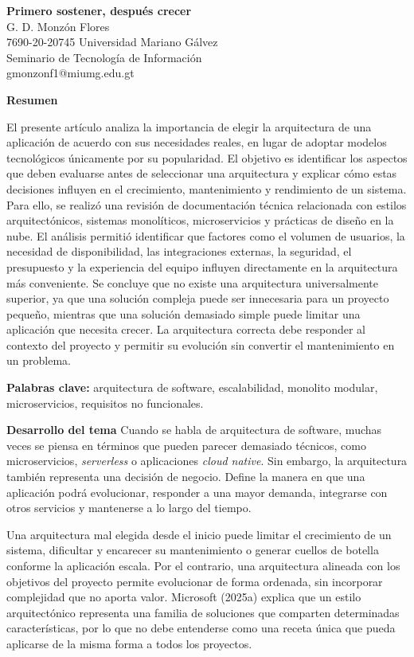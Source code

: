 \documentclass[12pt,letterpaper]{article}
\begin{document}
\begin{center}
    {\large\textbf{Primero sostener, después crecer}}\\[0.3cm]
    G. D. Monzón Flores\\
    7690-20-20745 Universidad Mariano Gálvez\\[0.15cm]
    Seminario de Tecnología de Información\\
    gmonzonf1@miumg.edu.gt
\end{center}

\textbf{Resumen}

El presente artículo analiza la importancia de elegir la arquitectura de una aplicación de acuerdo con sus necesidades reales, en lugar de adoptar modelos tecnológicos únicamente por su popularidad. El objetivo es identificar los aspectos que deben evaluarse antes de seleccionar una arquitectura y explicar cómo estas decisiones influyen en el crecimiento, mantenimiento y rendimiento de un sistema. Para ello, se realizó una revisión de documentación técnica relacionada con estilos arquitectónicos, sistemas monolíticos, microservicios y prácticas de diseño en la nube. El análisis permitió identificar que factores como el volumen de usuarios, la necesidad de disponibilidad, las integraciones externas, la seguridad, el presupuesto y la experiencia del equipo influyen directamente en la arquitectura más conveniente. Se concluye que no existe una arquitectura universalmente superior, ya que una solución compleja puede ser innecesaria para un proyecto pequeño, mientras que una solución demasiado simple puede limitar una aplicación que necesita crecer. La arquitectura correcta debe responder al contexto del proyecto y permitir su evolución sin convertir el mantenimiento en un problema.

\textbf{Palabras clave:} arquitectura de software, escalabilidad, monolito modular, microservicios, requisitos no funcionales.

\textbf{Desarrollo del tema}
Cuando se habla de arquitectura de software, muchas veces se piensa en términos que pueden parecer demasiado técnicos, como microservicios, \textit{serverless} o aplicaciones \textit{cloud native}. Sin embargo, la arquitectura también representa una decisión de negocio. Define la manera en que una aplicación podrá evolucionar, responder a una mayor demanda, integrarse con otros servicios y mantenerse a lo largo del tiempo.

Una arquitectura mal elegida desde el inicio puede limitar el crecimiento de un sistema, dificultar y encarecer su mantenimiento o generar cuellos de botella conforme la aplicación escala. Por el contrario, una arquitectura alineada con los objetivos del proyecto permite evolucionar de forma ordenada, sin incorporar complejidad que no aporta valor. Microsoft (2025a) explica que un estilo arquitectónico representa una familia de soluciones que comparten determinadas características, por lo que no debe entenderse como una receta única que pueda aplicarse de la misma forma a todos los proyectos.
\end{document}
